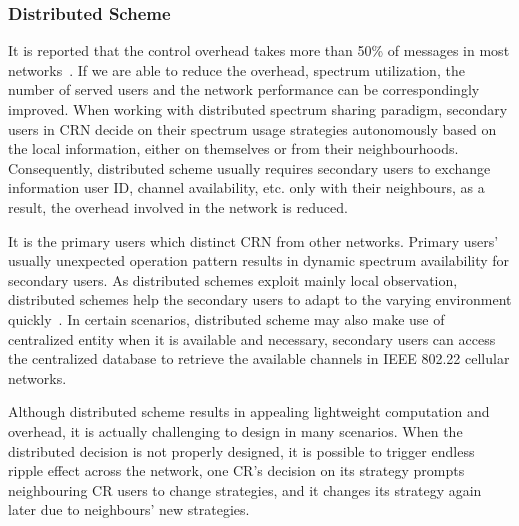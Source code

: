 
\subsubsection*{Distributed Scheme}

It is reported that the control overhead takes more than 50\% of messages in most networks~\cite{Han:2008:RAW:1457343}.
If we are able to reduce the overhead, spectrum utilization, the number of served users and the network performance can be correspondingly improved.
When working with distributed spectrum sharing paradigm, secondary users in CRN decide on their spectrum usage strategies autonomously based on the local information, \ie either on themselves or from their neighbourhoods.
Consequently, distributed scheme usually requires secondary users to exchange information \ie user ID, channel availability, etc. only with their neighbours, as a result, the overhead involved in the network is reduced.

It is the primary users which distinct CRN from other networks.
Primary users' usually unexpected operation pattern results in dynamic spectrum availability for secondary users.
As distributed schemes exploit mainly local observation, distributed schemes help the secondary users to adapt to the varying environment quickly~\cite{Selforganization_CRN_13}.
%
In certain scenarios, distributed scheme may also make use of centralized entity when it is available and necessary, \ie secondary users can access the centralized database to retrieve the available channels in IEEE 802.22 cellular networks.

Although distributed scheme results in appealing lightweight computation and overhead, it is actually challenging to design in many scenarios.
When the distributed decision is not properly designed, it is possible to trigger endless ripple effect across the network, \ie one CR's decision on its strategy prompts neighbouring CR users to change strategies, and it changes its strategy again later due to neighbours' new strategies.


